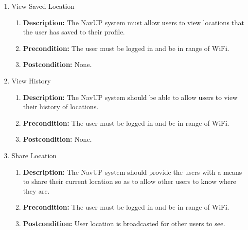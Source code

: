 \documentclass{article}
\begin{document}
\begin{enumerate}
\begin{enumerate}
		\item View Saved Location 
		\begin{enumerate}
			\item \textbf{Description:} The NavUP system must allow users to view locations that the user has saved to their profile. 
			\item \textbf{Precondition:} The user must be logged in and be in range of WiFi.
			\item \textbf{Postcondition:} None.\newline
		\end{enumerate}
		
		\item View History 
		\begin{enumerate}
			\item \textbf{Description:} The NavUP system should be able to allow users to view their history of locations.
			\item \textbf{Precondition:} The user must be logged in and be in range of WiFi.
			\item \textbf{Postcondition:} None.\newline
		\end{enumerate}
		
		\item Share Location  
		\begin{enumerate}
			\item \textbf{Description:} The NavUP system should provide the users with a means to share their current location so as to allow other users to know where they are. 
			\item \textbf{Precondition:} The user must be logged in and be in range of WiFi.
			\item \textbf{Postcondition:} User location is broadcasted for other users to see.\newline
		\end{enumerate}
		

\end{enumerate}
\end{enumerate}
\end{document}
